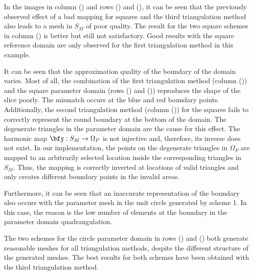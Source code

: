In the images in column () and rows () and (), it can be seen that the previously observed effect of a bad mapping for squares and the third triangulation method also leads to a mesh in $S_M$ of poor quality.
The result for the two square schemes in column () is better but still not satisfactory. Good results with the square reference domain are only observed for the first triangulation method in this example.

It can be seen that the approximation quality of the boundary of the domain varies. Most of all, the combination of the first triangulation method (column ()) and the square parameter domain (rows () and ()) reproduces the shape of the slice poorly. 
The mismatch occurs at the blue and red boundary points. Additionally, the second triangulation method (column ()) for the squares fails to correctly represent the round boundary at the bottom of the domain.
The degenerate triangles in the parameter domain are the cause for this effect. The harmonic map $\bfy: S_M \to \Omega_P$ is not injective and, therefore, its inverse does not exist. In our implementation, the points on the degenerate triangles in $\Omega_P$ are mapped to an arbitrarily selected location inside the corresponding triangles in $S_M$. Thus, the mapping is correctly inverted at locations of valid triangles and only creates different boundary points in the invalid areas.


Furthermore, it can be seen that an inaccurate representation of the boundary also occurs with the parameter mesh in the unit circle generated by scheme 1. In this case, the reason is the low number of elements at the boundary in the parameter domain quadrangulation.

The two schemes for the circle parameter domain in rows () and () both generate reasonable meshes for all triangulation methods, despite the different structure of the generated meshes. The best results for both schemes have been obtained with the third triangulation method.

